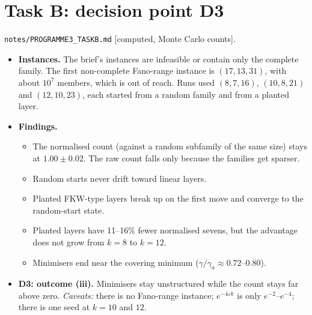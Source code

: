 \documentclass[11pt]{article}
\newcommand{\lvl}[1]{\textsf{\small[#1]}}
\begin{document}
\section{Task B: decision point D3}
\texttt{notes/PROGRAMME3\_TASKB.md} \lvl{computed, Monte Carlo counts}.
\begin{itemize}
\item \textbf{Instances.} The brief's instances are infeasible or contain only the complete family. The first non-complete
Fano-range instance is $(17,13,31)$, with about $10^7$ members, which is out of reach. Runs used $(8,7,16)$, $(10,8,21)$ and
$(12,10,23)$, each started from a random family and from a planted layer.
\item \textbf{Findings.}
  \begin{itemize}
  \item The normalised count (against a random subfamily of the same size) stays at $1.00\pm0.02$. The raw count falls only
  because the families get sparser.
  \item Random starts never drift toward linear layers.
  \item Planted FKW-type layers break up on the first move and converge to the random-start state.
  \item Planted layers have 11--16\% fewer normalised sevens, but the advantage does not grow from $k=8$ to $k=12$.
  \item Minimisers end near the covering minimum ($\gamma/\gamma_a\approx0.72$--$0.80$).
  \end{itemize}
\item \textbf{D3: outcome (iii).} Minimisers stay unstructured while the count stays far above zero. \emph{Caveats:} there is
no Fano-range instance; $e^{-4\varepsilon k}$ is only $e^{-2}$--$e^{-4}$; there is one seed at $k=10$ and $12$.
\end{itemize}
\end{document}
